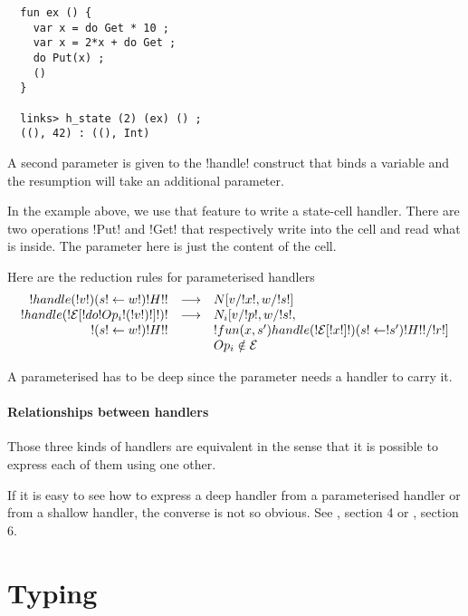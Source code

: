 \documentclass[11pt, nonacm=true, language=french, language=english]{acmart}
\begin{document}
\begin{lstlisting}
  fun ex () {
    var x = do Get * 10 ;
    var x = 2*x + do Get ;
    do Put(x) ;
    ()
  }

  links> h_state (2) (ex) () ;
  ((), 42) : ((), Int)
\end{lstlisting}

A second parameter is given to the !handle! construct that binds a variable and the resumption will take an additional parameter.

In the example above, we use that feature to write a state-cell handler. There are two operations !Put! and !Get! that respectively write into the cell and read what is inside. The parameter here is just the content of the cell.

Here are the reduction rules for parameterised handlers
\[
  \begin{array}{rcll}
    !handle ( !v! ) ( s!\leftarrow w! ) { !H! }! & \longrightarrow & N[v/!x!, w/!s!] \\
    !handle ( !\mathcal E[!do !Op_{i}!( !v! )!]! ) !  & \longrightarrow & N_{i}[v/!p!, w/!s!, \\
    ! ( s!\leftarrow w! ) { !H! }!                        &                 & !fun (x, s')  { handle ( !\mathcal E[!x!] ! ) ( s!\leftarrow!s' ) { !H! } }!/!r!] \\
                                                     &                 & Op_{i} \notin \mathcal E\\
  \end{array}
\]

\begin{rem}
  A parameterised has to be deep since the parameter needs a handler to carry it.
\end{rem}

\paragraph{Relationships between handlers}

Those three kinds of handlers are equivalent in the sense that it is possible to express each of them using one other.

If it is easy to see how to express a deep handler from a parameterised handler or from a shallow handler, the converse is not so obvious. See \citep{ehgc}, section 4 or \citep{daniel-thesis}, section 6.

\section{Typing}
\end{document}

